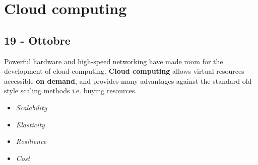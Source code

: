 \chapter{Cloud computing}
\section*{19 - Ottobre}
Powerful hardware and high-speed networking have made room for the development of cloud computing.
\textbf{Cloud computing} allows virtual resources accessible \textbf{on demand},
and provides many advantages against the standard old-style scaling methods i.e. buying resources.
\begin{itemize}
   \item \textit{Scalability}
   \item \textit{Elasticity}
   \item \textit{Resilience}
   \item \textit{Cost}
\end{itemize}

